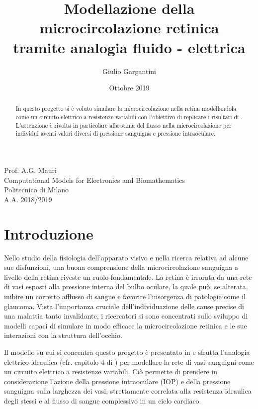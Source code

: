 \documentclass{article}
\title{\vspace{-2cm} Modellazione della microcircolazione retinica\\tramite analogia fluido - elettrica} %
\author{Giulio Gargantini} %
\date{Ottobre 2019} %
\begin{document}
\maketitle %

\begin{center}
Prof. A.G. Mauri \\
Computational Models for Electronics and Biomathematics\\
Politecnico di Milano\\
A.A. 2018/2019
\end{center}

\begin{abstract}
In questo progetto si è voluto simulare la microcircolazione nella retina modellandola come un circuito elettrico a resistenze variabili con l'obiettivo di replicare i risultati di \cite{art1}.
L'attenzione è rivolta in particolare alla stima del flusso nella microcircolazione per individui aventi valori diversi di pressione sanguigna e pressione intraoculare.
\end{abstract}

\tableofcontents
\newpage

\section{Introduzione}
Nello studio della fisiologia dell'apparato visivo e nella ricerca relativa ad alcune sue disfunzioni, una buona comprensione della microcircolazione sanguigna a livello della retina riveste un ruolo fondamentale.
La retina è irrorata da una rete di vasi esposti alla pressione interna del bulbo oculare, la quale può, se alterata, inibire un corretto afflusso di sangue e favorire l'insorgenza di patologie come il glaucoma.
Vista l'importanza cruciale dell'individuazione delle cause precise di una malattia tanto invalidante, i ricercatori si sono concentrati sullo sviluppo di modelli capaci di simulare in modo efficace la microcircolazione retinica e le sue interazioni con la struttura dell'occhio.

Il modello su cui si concentra questo progetto è presentato in \cite{art1} e sfrutta l'analogia elettrico-idraulica (cfr. capitolo 4 di \cite{notes}) per modellare la rete di vasi sanguigni come un circuito elettrico a resistenze variabili.
Ciò permette di prendere in considerazione l'azione della pressione intraoculare (IOP) e della pressione sanguigna sulla larghezza dei vasi, strettamente correlata alla resistenza idraulica degli stessi e al flusso di sangue complessivo in un ciclo cardiaco.
\end{document}
